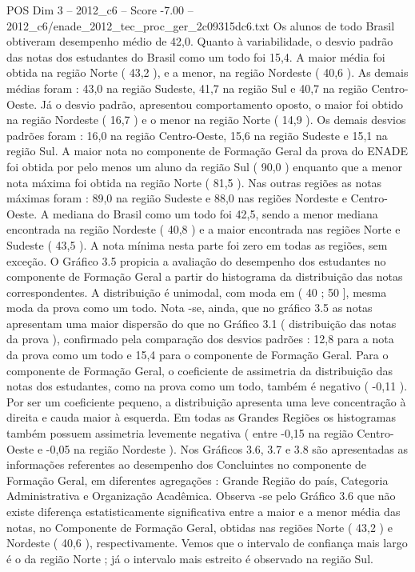 \begin{textsample}{POS Dim 3 – 2012\_c6 – Score -7.00 – 2012\_c6/enade\_2012\_tec\_proc\_ger\_2c09315dc6.txt}
Os alunos de todo Brasil obtiveram desempenho médio de 42,0.
Quanto à variabilidade, o desvio padrão das notas dos estudantes do Brasil como um todo foi 15,4.
A maior média foi obtida na região Norte ( 43,2 ), e a menor, na região Nordeste ( 40,6 ).
As demais médias foram : 43,0 na região Sudeste, 41,7 na região Sul e 40,7 na região Centro-Oeste.
Já o desvio padrão, apresentou comportamento oposto, o maior foi obtido na região Nordeste ( 16,7 ) e o menor na região Norte ( 14,9 ).
Os demais desvios padrões foram : 16,0 na região Centro-Oeste, 15,6 na região Sudeste e 15,1 na região Sul.
A maior nota no componente de Formação Geral da prova do ENADE foi obtida por pelo menos um aluno da região Sul ( 90,0 ) enquanto que a menor nota máxima foi obtida na região Norte ( 81,5 ).
Nas outras regiões as notas máximas foram : 89,0 na região Sudeste e 88,0 nas regiões Nordeste e Centro-Oeste.
A mediana do Brasil como um todo foi 42,5, sendo a menor mediana encontrada na região Nordeste ( 40,8 ) e a maior encontrada nas regiões Norte e Sudeste ( 43,5 ).
A nota mínima nesta parte foi zero em todas as regiões, sem exceção.
O Gráfico 3.5 propicia a avaliação do desempenho dos estudantes no componente de Formação Geral a partir do histograma da distribuição das notas correspondentes.
A distribuição é unimodal, com moda em ( 40 ; 50 ], mesma moda da prova como um todo.
Nota -se, ainda, que no gráfico 3.5 as notas apresentam uma maior dispersão do que no Gráfico 3.1 ( distribuição das notas da prova ), confirmado pela comparação dos desvios padrões : 12,8 para a nota da prova como um todo e 15,4 para o componente de Formação Geral.
Para o componente de Formação Geral, o coeficiente de assimetria da distribuição das notas dos estudantes, como na prova como um todo, também é negativo ( -0,11 ).
Por ser um coeficiente pequeno, a distribuição apresenta uma leve concentração à direita e cauda maior à esquerda.
Em todas as Grandes Regiões os histogramas também possuem assimetria levemente negativa ( entre -0,15 na região Centro-Oeste e -0,05 na região Nordeste ).
Nos Gráficos 3.6, 3.7 e 3.8 são apresentadas as informações referentes ao desempenho dos Concluintes no componente de Formação Geral, em diferentes agregações : Grande Região do país, Categoria Administrativa e Organização Acadêmica.
Observa -se pelo Gráfico 3.6 que não existe diferença estatisticamente significativa entre a maior e a menor média das notas, no Componente de Formação Geral, obtidas nas regiões Norte ( 43,2 ) e Nordeste ( 40,6 ), respectivamente.
Vemos que o intervalo de confiança mais largo é o da região Norte ; já o intervalo mais estreito é observado na região Sul.

\end{textsample}
